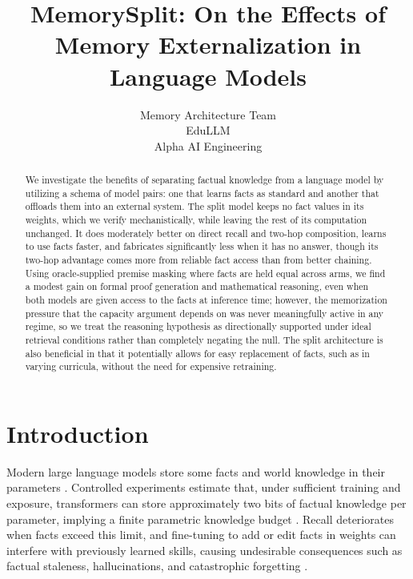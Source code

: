 \documentclass{article}
\title{
    MemorySplit: On the Effects of Memory Externalization in Language Models \\
  \vspace{0.9em}
}
\author{
  Memory Architecture Team \\
  EduLLM \\
  Alpha AI Engineering \\
}
\begin{document}
\maketitle

\begin{abstract}
We investigate the benefits of separating factual knowledge from a language model by utilizing a schema of model pairs: one that learns facts as standard and another that offloads them into an external system. The split model keeps no fact values in its weights, which we verify mechanistically, while leaving the rest of its computation unchanged. It does moderately better on direct recall and two-hop composition, learns to use facts faster, and fabricates significantly less when it has no answer, though its two-hop advantage comes more from reliable fact access than from better chaining. Using oracle-supplied premise masking where facts are held equal across arms, we find a modest gain on formal proof generation and mathematical reasoning, even when both models are given access to the facts at inference time; however, the memorization pressure that the capacity argument depends on was never meaningfully active in any regime, so we treat the reasoning hypothesis as directionally supported under ideal retrieval conditions rather than completely negating the null. The split architecture is also beneficial in that it potentially allows for easy replacement of facts, such as in varying curricula, without the need for expensive retraining.
\end{abstract}

\section{Introduction}

Modern large language models \citep{vaswani2017attention} store some facts and world knowledge in their parameters \citep{allenzhu2023storage}. Controlled experiments estimate that, under sufficient training and exposure, transformers can store approximately two bits of factual knowledge per parameter, implying a finite parametric knowledge budget \citep{allenzhu2024capacity}. Recall deteriorates when facts exceed this limit, and fine-tuning to add or edit facts in weights can interfere with previously learned skills, causing undesirable consequences such as factual staleness, hallucinations, and catastrophic forgetting \citep{gupta2024editing}.
\end{document}
